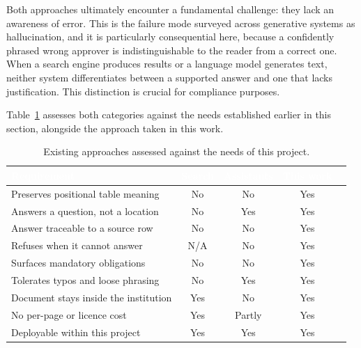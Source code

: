 Both approaches ultimately encounter a fundamental challenge: they lack an awareness of error. This is the failure mode surveyed across generative systems as hallucination\citep{ji2023hallucination}, and it is particularly consequential here, because a confidently phrased wrong approver is indistinguishable to the reader from a correct one. When a search engine produces results or a language model generates text, neither system differentiates between a supported answer and one that lacks justification. This distinction is crucial for compliance purposes.

Table~\ref{tab:existing} assesses both categories against the needs established earlier in this section, alongside the approach taken in this work.

\begin{table}[h]
\centering
\caption{Existing approaches assessed against the needs of this project.}
\label{tab:existing}
\small
\begin{tabular}{|p{}|c|c|c|c|}
\hline
\rowcolor{myblue}
\textcolor{white}{\textbf{Requirement}} &
\textcolor{white}{\textbf{Search}} &
\textcolor{white}{\textbf{Assistants}} &
\textcolor{white}{\textbf{This work}} \\
\hline
Preserves positional table meaning & No & No & Yes \\ \hline
Answers a question, not a location & No & Yes & Yes \\ \hline
Answer traceable to a source row & No & No & Yes \\ \hline
Refuses when it cannot answer & N/A & No & Yes \\ \hline
Surfaces mandatory obligations & No & No & Yes \\ \hline
Tolerates typos and loose phrasing & No & Yes & Yes \\ \hline
Document stays inside the institution & Yes & No & Yes \\ \hline
No per-page or licence cost & Yes & Partly & Yes \\ \hline
Deployable within this project & Yes & Yes & Yes \\ \hline
\end{tabular}
\end{table}

